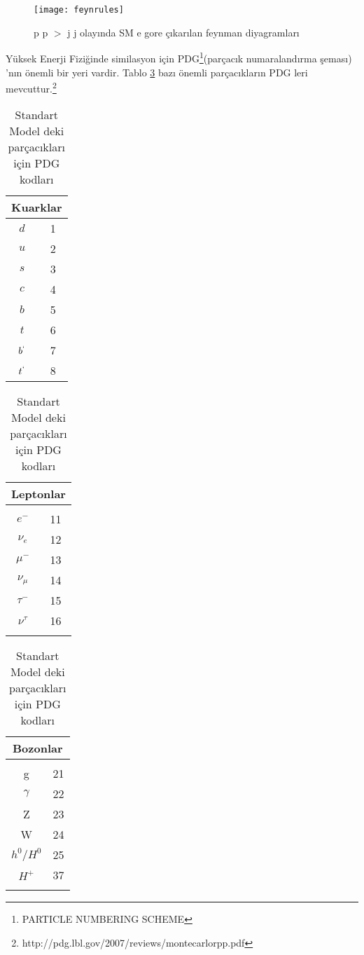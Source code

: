 \begin{figure}[!h]
		\texttt{[image: feynrules]}
		\caption[p p $>$ j j olayında SM e gore çıkarılan feynman diyagramları]%
        {{\small p p $>$ j j olayında SM e gore çıkarılan feynman diyagramları}}    
        \label{fig:feynrules}
\end{figure}
\par Yüksek Enerji Fiziğinde similasyon için PDG\footnote{PARTICLE NUMBERING SCHEME}(parçacık numaralandırma şeması) 'nın önemli bir yeri vardir. 
Tablo \ref{tab:pdg} bazı önemli parçacıkların PDG leri mevcuttur.\footnote{http://pdg.lbl.gov/2007/reviews/montecarlorpp.pdf}\\
\begin{table}[!htbp]

\centering

\begin{tabular}{|c|c|}

\hline 
\multicolumn{2}{|c|}{Kuarklar} \\ 
\hline 
$d$ & 1 \\ 
\hline 
$u$ & 2 \\ 
\hline 
$s$ & 3 \\ 
\hline 
$c$ & 4 \\ 
\hline 
$b$ & 5 \\ 
\hline 
$t$ & 6 \\ 
\hline 
$b^`$ & 7 \\ 
\hline 
$t^`$ & 8 \\ 
\hline 

\end{tabular} 
\begin{tabular}{|c|c|}

\hline 
\multicolumn{2}{|c|}{Leptonlar} \\ 
\hline 
&\\
\hline 
$e^-$ & 11 \\
\hline 
$\nu_e$ & 12 \\
\hline 
$\mu ^-$ & 13 \\
\hline 
$\nu_\mu$ & 14 \\
\hline 
$\tau^-$ & 15 \\
\hline 
$\nu^\tau$ & 16 \\ 
\hline 

&\\

\hline
\end{tabular}
\begin{tabular}{|c|c|}
\hline 
\multicolumn{2}{|c|}{Bozonlar} \\ 
\hline 
&\\
\hline 
g & 21 \\ 
\hline 
$\gamma$ & 22 \\ 
\hline 
Z & 23 \\ 
\hline 
W & 24 \\ 
\hline 
$h^0 / H^0 $ & 25 \\ 
\hline 
$H^+$ & 37 \\
\hline 
&\\ 
\hline 
\end{tabular} 
\caption{Standart Model deki parçacıkları için PDG kodları}
\label{tab:pdg}
\end{table}


